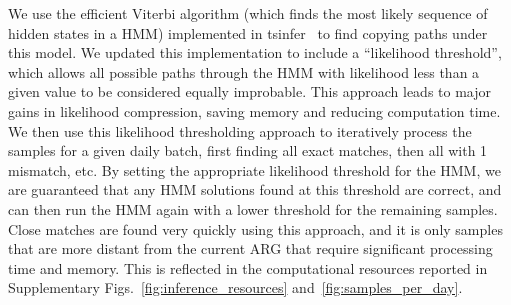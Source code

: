 \documentclass[12pt]{article}
\makeatletter
\newcommand{\refprefix}[1]{#1~}
\newcommand{\numref}[1]{{\let\refprefix\@gobble\ref{#1}}}
\makeatother
\begin{document}
We use the efficient Viterbi algorithm
(which finds the most likely sequence of hidden states in a HMM)
implemented in tsinfer~\cite{Kelleher2019}
to find copying paths under this model. We updated this
implementation to include a ``likelihood threshold'', which allows
all possible paths through the HMM with likelihood less than a given
value to be considered equally improbable. This approach leads to major
gains in likelihood compression, saving memory and reducing computation
time. We then use this likelihood thresholding approach to iteratively
process the samples for a given daily batch, first finding all exact
matches, then all with 1 mismatch, etc. By setting the appropriate
likelihood threshold for the HMM, we are guaranteed that any HMM
solutions found at this threshold are correct, and can then run the HMM again
with a lower threshold for the remaining samples. Close matches
are found very quickly using this approach, and it is only
samples that are more distant from the current ARG that require
significant processing time and memory. This is reflected in
the computational resources reported in
Supplementary Figs.~\numref{fig:inference_resources} and~\numref{fig:samples_per_day}.





\end{document}

